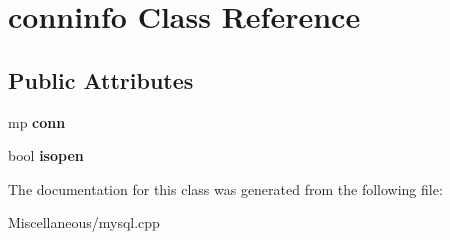 \hypertarget{classconninfo}{\section{conninfo Class Reference}
\label{classconninfo}
}
\subsection*{Public Attributes}
\begin{DoxyCompactItemize}
\item 
\hypertarget{classconninfo_a3fa4d6e74a3e62cc539c999b577b382c}{mp {\bfseries conn}}\label{classconninfo_a3fa4d6e74a3e62cc539c999b577b382c}

\item 
\hypertarget{classconninfo_a58ba9ea5ae85ac14ab00acd0a19fee2d}{bool {\bfseries isopen}}\label{classconninfo_a58ba9ea5ae85ac14ab00acd0a19fee2d}

\end{DoxyCompactItemize}


The documentation for this class was generated from the following file\+:\begin{DoxyCompactItemize}
\item 
Miscellaneous/mysql.\+cpp\end{DoxyCompactItemize}
